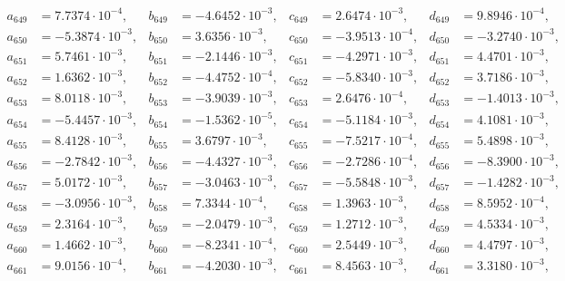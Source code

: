 \begin{align*}
  a_{ 649 } &= 7.7374 \cdot 10^{ -4 }, & b_{ 649 } &= -4.6452 \cdot 10^{ -3 }, & c_{ 649 } &= 2.6474 \cdot 10^{ -3 }, & d_{ 649 } &= 9.8946 \cdot 10^{ -4 }, \\ 
  a_{ 650 } &= -5.3874 \cdot 10^{ -3 }, & b_{ 650 } &= 3.6356 \cdot 10^{ -3 }, & c_{ 650 } &= -3.9513 \cdot 10^{ -4 }, & d_{ 650 } &= -3.2740 \cdot 10^{ -3 }, \\ 
  a_{ 651 } &= 5.7461 \cdot 10^{ -3 }, & b_{ 651 } &= -2.1446 \cdot 10^{ -3 }, & c_{ 651 } &= -4.2971 \cdot 10^{ -3 }, & d_{ 651 } &= 4.4701 \cdot 10^{ -3 }, \\ 
  a_{ 652 } &= 1.6362 \cdot 10^{ -3 }, & b_{ 652 } &= -4.4752 \cdot 10^{ -4 }, & c_{ 652 } &= -5.8340 \cdot 10^{ -3 }, & d_{ 652 } &= 3.7186 \cdot 10^{ -3 }, \\ 
  a_{ 653 } &= 8.0118 \cdot 10^{ -3 }, & b_{ 653 } &= -3.9039 \cdot 10^{ -3 }, & c_{ 653 } &= 2.6476 \cdot 10^{ -4 }, & d_{ 653 } &= -1.4013 \cdot 10^{ -3 }, \\ 
  a_{ 654 } &= -5.4457 \cdot 10^{ -3 }, & b_{ 654 } &= -1.5362 \cdot 10^{ -5 }, & c_{ 654 } &= -5.1184 \cdot 10^{ -3 }, & d_{ 654 } &= 4.1081 \cdot 10^{ -3 }, \\ 
  a_{ 655 } &= 8.4128 \cdot 10^{ -3 }, & b_{ 655 } &= 3.6797 \cdot 10^{ -3 }, & c_{ 655 } &= -7.5217 \cdot 10^{ -4 }, & d_{ 655 } &= 5.4898 \cdot 10^{ -3 }, \\ 
  a_{ 656 } &= -2.7842 \cdot 10^{ -3 }, & b_{ 656 } &= -4.4327 \cdot 10^{ -3 }, & c_{ 656 } &= -2.7286 \cdot 10^{ -4 }, & d_{ 656 } &= -8.3900 \cdot 10^{ -3 }, \\ 
  a_{ 657 } &= 5.0172 \cdot 10^{ -3 }, & b_{ 657 } &= -3.0463 \cdot 10^{ -3 }, & c_{ 657 } &= -5.5848 \cdot 10^{ -3 }, & d_{ 657 } &= -1.4282 \cdot 10^{ -3 }, \\ 
  a_{ 658 } &= -3.0956 \cdot 10^{ -3 }, & b_{ 658 } &= 7.3344 \cdot 10^{ -4 }, & c_{ 658 } &= 1.3963 \cdot 10^{ -3 }, & d_{ 658 } &= 8.5952 \cdot 10^{ -4 }, \\ 
  a_{ 659 } &= 2.3164 \cdot 10^{ -3 }, & b_{ 659 } &= -2.0479 \cdot 10^{ -3 }, & c_{ 659 } &= 1.2712 \cdot 10^{ -3 }, & d_{ 659 } &= 4.5334 \cdot 10^{ -3 }, \\ 
  a_{ 660 } &= 1.4662 \cdot 10^{ -3 }, & b_{ 660 } &= -8.2341 \cdot 10^{ -4 }, & c_{ 660 } &= 2.5449 \cdot 10^{ -3 }, & d_{ 660 } &= 4.4797 \cdot 10^{ -3 }, \\ 
  a_{ 661 } &= 9.0156 \cdot 10^{ -4 }, & b_{ 661 } &= -4.2030 \cdot 10^{ -3 }, & c_{ 661 } &= 8.4563 \cdot 10^{ -3 }, & d_{ 661 } &= 3.3180 \cdot 10^{ -3 }, \\ 

\end{align*}
